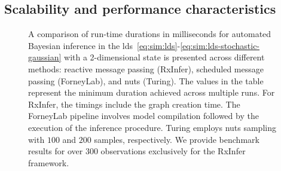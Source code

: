 \subsection{Scalability and performance characteristics}

\begin{figure}
  \centering
  \caption{
    A comparison of run-time durations in milliseconds for automated Bayesian inference in the \ac{lds}~\eqref{eq:sim:lds}-\eqref{eq:sim:lds-stochastic-gaussian} with a 2-dimensional state is presented across
    different methods: reactive message passing (RxInfer), scheduled message passing (ForneyLab),
    and \ac{nuts} (Turing).
    The values in the table represent the minimum duration achieved across multiple runs.
    For RxInfer, the timings include the graph creation time.
    The ForneyLab pipeline involves model compilation followed by the execution of the inference
    procedure.
    Turing employs \ac{nuts} sampling with $100$ and $200$ samples, respectively.
    We provide benchmark results for over $300$ observations exclusively for the RxInfer
    framework.
  }
  \label{fig:sim:lds_performance_comparison}
\end{figure}

